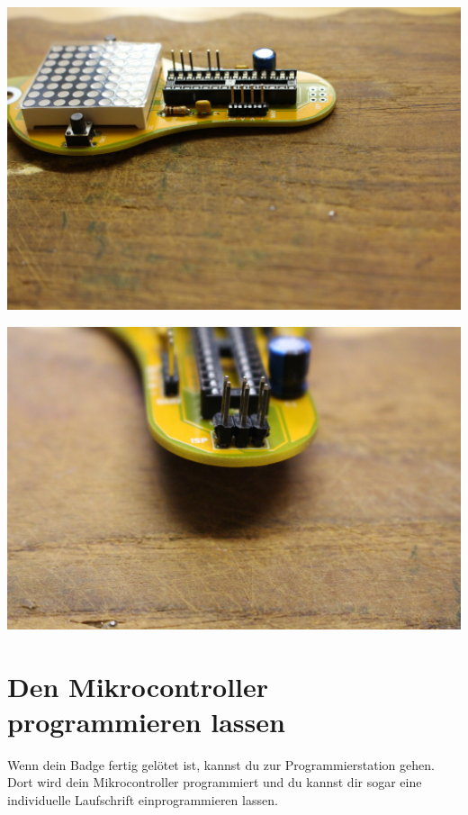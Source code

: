 \documentclass{article}
\begin{document}
\begin{minipage}[b]{0.5\textwidth}
	\includegraphics[width=\textwidth]{Bilder/IMG_5612.JPG}
\end{minipage}
\begin{minipage}[b]{0.5\textwidth}
	\includegraphics[width=\textwidth]{Bilder/IMG_5616.JPG}
\end{minipage}

\section{Den Mikrocontroller programmieren lassen}

Wenn dein Badge fertig gelötet ist, kannst du zur Programmierstation gehen. Dort wird dein Mikrocontroller programmiert und du kannst dir sogar eine individuelle Laufschrift einprogrammieren lassen.
\end{document}

